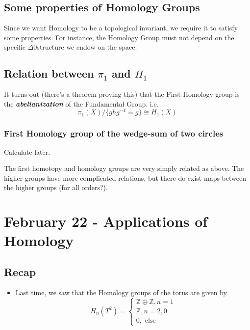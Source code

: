\documentclass{article}
\begin{document}
\vskip 1cm
\subsection{Some properties of Homology Groups}

\vskip 0.5cm 
Since we want Homology to be a topological invariant, we require it to satisfy some properties. For instance, the Homology Group must not depend on the specific $\Delta$0structure we endow on the space.

\vskip 1cm 
\subsection*{Relation between $\pi_1$ and $H_1$}

It turns out (there's a theorem proving this) that the First Homology group is the \emph{\textbf{abelianization}} of the Fundamental Group. i.e.
\[ \pi_1(X) /\{ghg^{-1} = g\} \cong H_1(X) \]

\vskip 1cm 
\subsubsection*{First Homology group of the wedge-sum of two circles}
Calculate later.

\vskip 1cm 
The first homotopy and homology groups are very simply related as above. The higher groups have more complicated relations, but there do exist maps between the higher groups (for all orders?).

\pagebreak

\section*{February 22 - Applications of Homology}

\vskip 0.5cm
\subsection*{Recap}
\begin{itemize}
  \item Last time, we saw that the Homology groups of the torus are given by 
  \[ H_n\left( T^2 \right) = \begin{cases}
    \mathbb{Z} \oplus \mathbb{Z}, n = 1 \\
    \mathbb{Z}, n = 2, 0 \\
    0, \text{ else}
  \end{cases} \]
\end{itemize}
\end{document}
